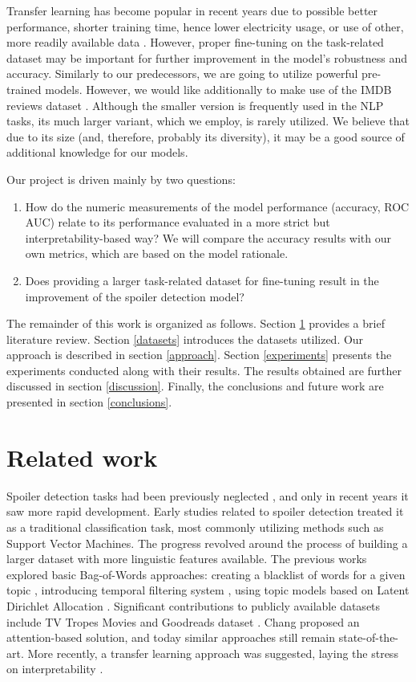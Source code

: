 \documentclass[11pt]{article}
\begin{document}
Transfer learning has become popular in recent years due to possible better performance, shorter training time, hence lower electricity usage, or use of other, more readily available data \cite{torrey2010transfer,weiss2016survey}. However, proper fine-tuning on the task-related dataset may be important for further improvement in the model's robustness and accuracy. Similarly to our predecessors, we are going to utilize powerful pre-trained models. However, we would like additionally to make use of the IMDB reviews dataset \cite{enam_biswas_2021}. Although the smaller version is frequently used in the NLP tasks, its much larger variant, which we employ, is rarely utilized. We believe that due to its size (and, therefore, probably its diversity), it may be a good source of additional knowledge for our models.

Our project is driven mainly by two questions: 
\begin{enumerate}
    \item How do the numeric measurements of the model performance (accuracy, ROC AUC) relate to its performance evaluated in a more strict but interpretability-based way? We will compare the accuracy results with our own metrics, which are based on the model rationale.
    \item Does providing a larger task-related dataset for fine-tuning result in the improvement of the spoiler detection model?
\end{enumerate}

The remainder of this work is organized as follows. Section \ref{related-work} provides a brief literature review. Section \ref{datasets} introduces the datasets utilized. Our approach is described in section \ref{approach}. Section \ref{experiments} presents the experiments conducted along with their results. The results obtained are further discussed in section \ref{discussion}. Finally, the conclusions and future work are presented in section \ref{conclusions}.

\section{Related work} \label{related-work}
Spoiler detection tasks had been previously neglected \cite{wan2019fine}, and only in recent years it saw more rapid development. Early studies related to spoiler detection treated it as a traditional classification task, most commonly utilizing methods such as Support Vector Machines. The progress revolved around the process of building a larger dataset with more linguistic features available. The previous works explored basic Bag-of-Words approaches: creating a blacklist of words for a given topic \cite{golbeck2012twitter}, introducing temporal filtering system \cite{nakamura2007temporal}, using topic models based on Latent Dirichlet Allocation \cite{guo2010finding}. Significant contributions to publicly available datasets include TV Tropes Movies \cite{boyd2013spoiler} and Goodreads dataset \cite{wan2019fine}. Chang  proposed an attention-based solution, and today similar approaches still remain state-of-the-art. More recently, a transfer learning approach was suggested, laying the stress on interpretability \cite{wroblewska2021spoiler}.
\end{document}
